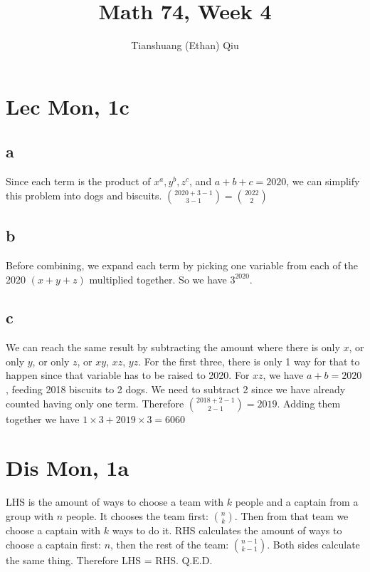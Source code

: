 \documentclass[12pt]{article}
\author{Tianshuang (Ethan) Qiu}
\begin{document}
\title{Math 74, Week 4}
\maketitle

\section{Lec Mon, 1c}
\subsection{a}
Since each term is the product of $x^a, y^b, z^c$, and $a+b+c = 2020$, we can simplify this problem into dogs and biscuits. $\binom{2020+3-1}{3-1} = \binom{2022}{2}$

\subsection{b}
Before combining, we expand each term by picking one variable from each of the 2020 $(x+y+z)$ multiplied together. So we have $3^2020$.

\subsection{c}
We can reach the same result by subtracting the amount where there is only $x$, or only $y$, or only $z$, or $xy$, $xz$, $yz$.
\newline
For the first three, there is only 1 way for that to happen since that variable has to be raised to 2020. For $xz$, we have $a+b = 2020$, feeding 2018 biscuits to 2 dogs. We need to subtract 2 since we have already counted having only one term. Therefore $\binom{2018+2-1}{2-1} = 2019$.
\newline
Adding them together we have $1 \times 3 + 2019 \times 3 = 6060$
\newpage


\section{Dis Mon, 1a}
LHS is the amount of ways to choose a team with $k$ people and a captain from a group with $n$ people. It chooses the team first: $\binom{n}{k}$. Then from that team we choose a captain with $k$ ways to do it.
\newline
RHS calculates the amount of ways to choose a captain first: $n$, then the rest of the team: $\binom{n-1}{k-1}$. Both sides calculate the same thing. Therefore LHS = RHS.
\newline
Q.E.D.
\end{document}
